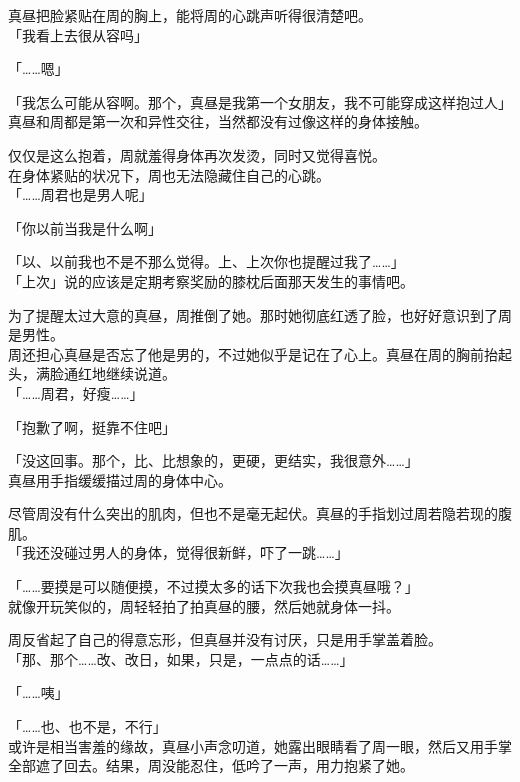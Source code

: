 真昼把脸紧贴在周的胸上，能将周的心跳声听得很清楚吧。\\

「我看上去很从容吗」

「……嗯」

「我怎么可能从容啊。那个，真昼是我第一个女朋友，我不可能穿成这样抱过人」\\

真昼和周都是第一次和异性交往，当然都没有过像这样的身体接触。

仅仅是这么抱着，周就羞得身体再次发烫，同时又觉得喜悦。\\

在身体紧贴的状况下，周也无法隐藏住自己的心跳。\\

「……周君也是男人呢」

「你以前当我是什么啊」

「以、以前我也不是不那么觉得。上、上次你也提醒过我了……」\\

「上次」说的应该是定期考察奖励的膝枕后面那天发生的事情吧。

为了提醒太过大意的真昼，周推倒了她。那时她彻底红透了脸，也好好意识到了周是男性。\\

周还担心真昼是否忘了他是男的，不过她似乎是记在了心上。真昼在周的胸前抬起头，满脸通红地继续说道。\\

「……周君，好瘦……」

「抱歉了啊，挺靠不住吧」

「没这回事。那个，比、比想象的，更硬，更结实，我很意外……」\\

真昼用手指缓缓描过周的身体中心。

尽管周没有什么突出的肌肉，但也不是毫无起伏。真昼的手指划过周若隐若现的腹肌。\\

「我还没碰过男人的身体，觉得很新鲜，吓了一跳……」

「……要摸是可以随便摸，不过摸太多的话下次我也会摸真昼哦？」\\

就像开玩笑似的，周轻轻拍了拍真昼的腰，然后她就身体一抖。

周反省起了自己的得意忘形，但真昼并没有讨厌，只是用手掌盖着脸。\\

「那、那个……改、改日，如果，只是，一点点的话……」

「……咦」

「……也、也不是，不行」\\

或许是相当害羞的缘故，真昼小声念叨道，她露出眼睛看了周一眼，然后又用手掌全部遮了回去。结果，周没能忍住，低吟了一声，用力抱紧了她。
